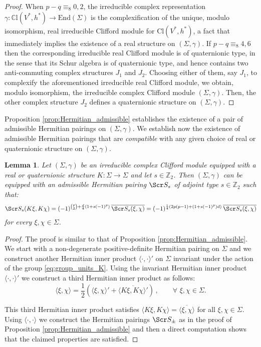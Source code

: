 \documentclass[10pt,a4paper,twoside,reqno]{amsart}
\theoremstyle{plain}
\newtheorem{lemma}[thm]{Lemma}
\theoremstyle{definition}
\theoremstyle{remark}
\newcommand{\End}{\mathrm{End}}
\def\scS{\Scr S}
\def\Cl{\mathrm{Cl}}
\newcommand{\escal}[1]{\langle#1\rangle}
\begin{document}
\begin{proof}
When $p-q\equiv_8 0,2$, the irreducible complex representation $\gamma\colon\mathbb{C}\mathrm{l}(V^*,h^*) \to \End(\Sigma)$ is the complexification of the unique, modulo isomorphism, real irreducible Clifford module for $\Cl(V^*,h^*)$, a fact that immediately implies the existence of a real structure on $(\Sigma,\gamma)$. If $p-q\equiv_8 4,6$ then the corresponding irreducible real Clifford module is of quaternionic type, in the sense that its Schur algebra is of quaternionic type, and hence contains two anti-commuting complex structures $J_1$ and $J_2$. Choosing either of them, say $J_1$, to complexify the aforementioned irreducible real Clifford module, we obtain, modulo isomorphism, the irreducible complex Clifford module $(\Sigma,\gamma)$. Then, the other complex structure $J_2$ defines a quaternionic structure on $(\Sigma,\gamma)$.
\end{proof}

\noindent
Proposition \ref{prop:Hermitian_admissible} establishes the existence of a pair of admissible Hermitian pairings on $(\Sigma,\gamma)$. We establish now the existence of admissible Hermitian pairings that are \emph{compatible} with any given choice of real or quaternionic structure on $(\Sigma,\gamma)$.  

\begin{lemma}
\label{lemma:compatible_admissible_pairings}
Let $(\Sigma,\gamma)$ be an irreducible complex Clifford module equipped with a real or quaternionic structure $K\colon \Sigma \to \Sigma$ and let $s\in\mathbb{Z}_2$. Then $(\Sigma,\gamma)$ can be equipped with an admissible Hermitian pairing $\scS_s$ of adjoint type $s\in\mathbb{Z}_2$ such that:
\begin{eqnarray*}
\scS_{s}(K \xi , K \chi ) = (-1)^{\binom{p}{2}+\frac{d}{4}(1+s(-1)^p)}\, \overline{\scS_{s}( \xi , \chi )} = (-1)^{\frac{1}{4}(2p(p-1) + (1+s(-1)^p) d)}\, \overline{\scS_{s}( \xi , \chi )}
\end{eqnarray*}
 for every $\xi , \chi \in \Sigma$.
 \end{lemma}
 
\begin{proof}
The proof is similar to that of Proposition \ref{prop:Hermitian_admissible}. We start with a non-degenerate positive-definite Hermitian pairing on $\Sigma$ and we construct another Hermitian inner product $\escal{\cdot,\cdot}'$ on $\Sigma$ invariant under the action of the group \eqref{eq:group_units_K}. Using the invariant Hermitian inner product $\escal{\cdot,\cdot}'$ we construct a third Hermitian inner product as follows: 
\begin{equation*}
 \escal{\xi,\chi}=\frac{1}{2}(\escal{\xi,\chi}'+\overline{\escal{K\xi,K\chi}'}) \, , \qquad \forall\,\, \xi,\chi\in\Sigma.
 \end{equation*}

\noindent
This third Hermitian inner product satisfies $\escal{K\xi,K\chi}=\overline{\escal{\xi,\chi}}$ for all $\xi,\chi\in \Sigma$. Using $\escal{\cdot,\cdot}$ we construct the Hermitian pairings $\scS_\pm$ as in the proof of Proposition \ref{prop:Hermitian_admissible} and then a direct computation shows that the claimed properties are satisfied.
\end{proof}
\end{document}
